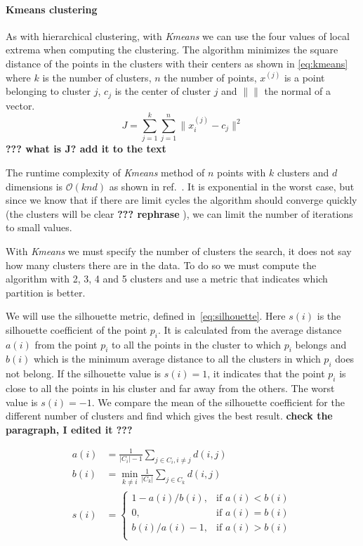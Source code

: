\paragraph{Kmeans clustering}

As with hierarchical clustering, with \emph{Kmeans} we can use the four values of local extrema when computing the clustering. The algorithm minimizes the square distance of the points in the clusters with their centers as shown in \cref{eq:kmeans} where $k$ is the number of clusters, $n$ the number of points, $x^{(j)}$ is a point belonging to cluster $j$, $c_j$ is the center of cluster $j$ and $\| \|$ the normal of a vector.
\begin{equation}\label{eq:kmeans}
J = \sum_{j=1}^k \sum_{j=1}^n \| x_i^{(j)} - c_j \|^2
\end{equation}
{\bf ??? what is J? add it to the text}

The runtime complexity of \emph{Kmeans} method of $n$ points with $k$ clusters and $d$ dimensions is $\mathcal{O}(knd)$ as shown in ref.~\cite{arthur_k-means_2009}.  It is exponential in the worst case, but since we know that if there are limit cycles the algorithm should converge quickly (the clusters will be clear
{\bf ??? rephrase}
), we can limit the number of iterations to small values.

With \emph{Kmeans} we must specify the number of clusters the search, it does not say how many clusters there are in the data. To do so we must compute the algorithm with 2, 3, 4 and 5 clusters and use a metric that indicates which partition is better.

We will use the silhouette metric, defined in~\cref{eq:silhouette}. Here $s(i)$ is the silhouette coefficient of the point $p_i$. It is calculated from the average distance $a(i)$ from the point $p_i$ to all the points in the cluster to which $p_i$ belongs and $b(i)$ which is the minimum average distance to all the clusters in which $p_i$ does not belong.
If the silhouette value is $s(i) = 1$, it indicates that the point $p_i$ is close to all the points in his cluster and far away from the others. The worst value is $s(i) = -1$. We compare the mean of the silhouette coefficient for the different number of clusters and find which gives the best result.
{\bf check the paragraph, I edited it ???}

\begin{align}\label{eq:silhouette}
    a(i) &= \frac{1}{|C_i| - 1} \sum_{j \in C_i, i \neq j} d(i, j) \nonumber \\
    b(i) &= \min_{k \neq i} \frac{1}{|C_k|} \sum_{j \in C_k} d(i, j) \nonumber \\
    s(i) &= \begin{cases}
          1-a(i)/b(i), & \mbox{if } a(i) < b(i) \\
          0,  & \mbox{if } a(i) = b(i) \\
          b(i)/a(i)-1, & \mbox{if } a(i) > b(i) \\
        \end{cases}
\end{align}
